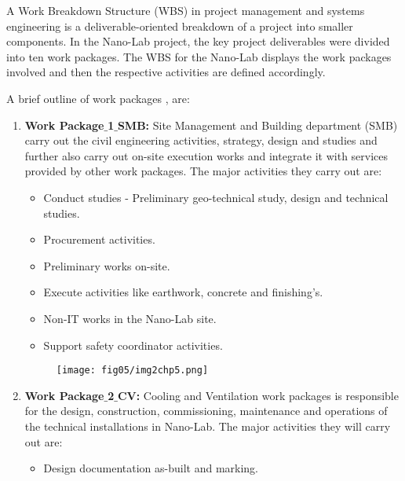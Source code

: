A Work Breakdown Structure (WBS) in project management and systems engineering is a deliverable-oriented breakdown of a project into smaller components. In the Nano-Lab project, the key project deliverables were divided into ten work packages. The WBS for the Nano-Lab displays the work packages involved and then the respective activities are defined accordingly.

A brief outline of work packages \cite{EN-Groups}, \cite{SMB:CERN} are:

\begin{enumerate}
	\item \textbf{Work Package$\_$1$\_$SMB:} Site Management and Building department (SMB) carry out the civil engineering activities, strategy, design and studies and further also carry out on-site execution works and integrate it with services provided by other work packages. The major activities they carry out are: 
	\begin{itemize}
		\item Conduct studies - Preliminary geo-technical study, design and technical studies. 
		
		\item Procurement activities.
		  
		\item Preliminary works on-site.
		
		\item Execute activities like earthwork, concrete and finishing's.
		
		\item Non-IT works in the Nano-Lab site. 
		
		\item Support safety coordinator activities.
	\end{itemize}
	
	\begin{figure}
		\centering
		\texttt{[image: fig05/img2chp5.png]}
	\end{figure}

	\item \textbf{Work Package$\_$2$\_$CV:} Cooling and Ventilation work packages is responsible for the design, construction, commissioning, maintenance and operations of the technical installations in Nano-Lab. The major activities they will carry out are: 
	\begin{itemize}
		\item Design documentation as-built and marking.
		

\end{itemize}
\end{enumerate}
